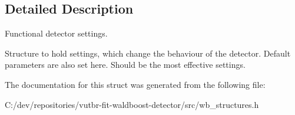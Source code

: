 \subsection{Detailed Description}
Functional detector settings. 

Structure to hold settings, which change the behaviour of the detector. Default parameters are also set here. Should be the most effective settings. 

The documentation for this struct was generated from the following file\+:\begin{DoxyCompactItemize}
\item 
C\+:/dev/repositories/vutbr-\/fit-\/waldboost-\/detector/src/wb\+\_\+structures.\+h\end{DoxyCompactItemize}
